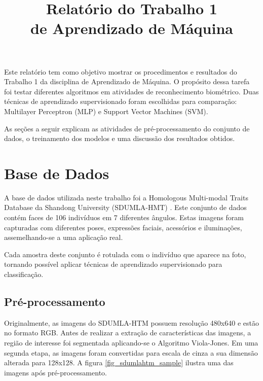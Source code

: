 \documentclass[conference]{IEEEtran}
\begin{document}
\title{Relatório do Trabalho 1\\ de Aprendizado de Máquina}

\author{
}

\maketitle

Este relatório tem como objetivo mostrar os procedimentos e resultados do Trabalho 1 da disciplina de Aprendizado de Máquina. O propósito dessa tarefa foi testar diferentes algoritmos em atividades de reconhecimento biométrico. Duas técnicas de aprendizado supervisionado foram escolhidas para comparação: Multilayer Perceptron (MLP) e Support Vector Machines (SVM).

As seções a seguir explicam as atividades de pré-processamento do conjunto de dados, o treinamento dos modelos e uma discussão dos resultados obtidos.

\section{Base de Dados}
A base de dados utilizada neste trabalho foi a Homologous Multi-modal Traits Database da Shandong University (SDUMLA-HMT) \cite{sdumlahtm}. Este conjunto de dados contém faces de 106 indivíduos em 7 diferentes ângulos. Estas imagens foram capturadas com diferentes poses, expressões faciais, acessórios e iluminações, assemelhando-se a uma aplicação real. 

Cada amostra deste conjunto é rotulada com o indivíduo que aparece na foto, tornando possível aplicar técnicas de aprendizado supervisionado para classificação.

\subsection{Pré-processamento}
Originalmente, as imagens do SDUMLA-HTM possuem resolução 480x640 e estão no formato RGB. Antes de realizar a extração de características das imagens, a região de interesse foi segmentada aplicando-se o Algoritmo Viola-Jones. Em uma segunda etapa, as imagens foram convertidas para escala de cinza a sua dimensão alterada para 128x128. A figura \ref{fig_sdumlahtm_sample} ilustra uma das imagens após pré-processamento.
\end{document}
